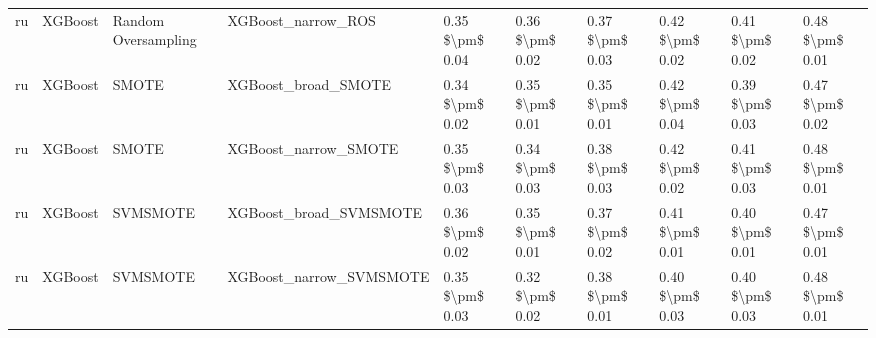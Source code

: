 \begin{tabular}{llllllllll}
      ru &                         XGBoost &           Random Oversampling &                           XGBoost\_narrow\_ROS & 0.35 \$\textbackslash pm\$ 0.04 &           0.36 \$\textbackslash pm\$ 0.02 &       0.37 \$\textbackslash pm\$ 0.03 &        0.42 \$\textbackslash pm\$ 0.02 &                         0.41 \$\textbackslash pm\$ 0.02 &     0.48 \$\textbackslash pm\$ 0.01 \\
      ru &                         XGBoost &                         SMOTE &                          XGBoost\_broad\_SMOTE & 0.34 \$\textbackslash pm\$ 0.02 &           0.35 \$\textbackslash pm\$ 0.01 &       0.35 \$\textbackslash pm\$ 0.01 &        0.42 \$\textbackslash pm\$ 0.04 &                         0.39 \$\textbackslash pm\$ 0.03 &     0.47 \$\textbackslash pm\$ 0.02 \\
      ru &                         XGBoost &                         SMOTE &                         XGBoost\_narrow\_SMOTE & 0.35 \$\textbackslash pm\$ 0.03 &           0.34 \$\textbackslash pm\$ 0.03 &       0.38 \$\textbackslash pm\$ 0.03 &        0.42 \$\textbackslash pm\$ 0.02 &                         0.41 \$\textbackslash pm\$ 0.03 &     0.48 \$\textbackslash pm\$ 0.01 \\
      ru &                         XGBoost &                      SVMSMOTE &                       XGBoost\_broad\_SVMSMOTE & 0.36 \$\textbackslash pm\$ 0.02 &           0.35 \$\textbackslash pm\$ 0.01 &       0.37 \$\textbackslash pm\$ 0.02 &        0.41 \$\textbackslash pm\$ 0.01 &                         0.40 \$\textbackslash pm\$ 0.01 &     0.47 \$\textbackslash pm\$ 0.01 \\
      ru &                         XGBoost &                      SVMSMOTE &                      XGBoost\_narrow\_SVMSMOTE & 0.35 \$\textbackslash pm\$ 0.03 &           0.32 \$\textbackslash pm\$ 0.02 &       0.38 \$\textbackslash pm\$ 0.01 &        0.40 \$\textbackslash pm\$ 0.03 &                         0.40 \$\textbackslash pm\$ 0.03 &     0.48 \$\textbackslash pm\$ 0.01 \\
\bottomrule
\end{tabular}
